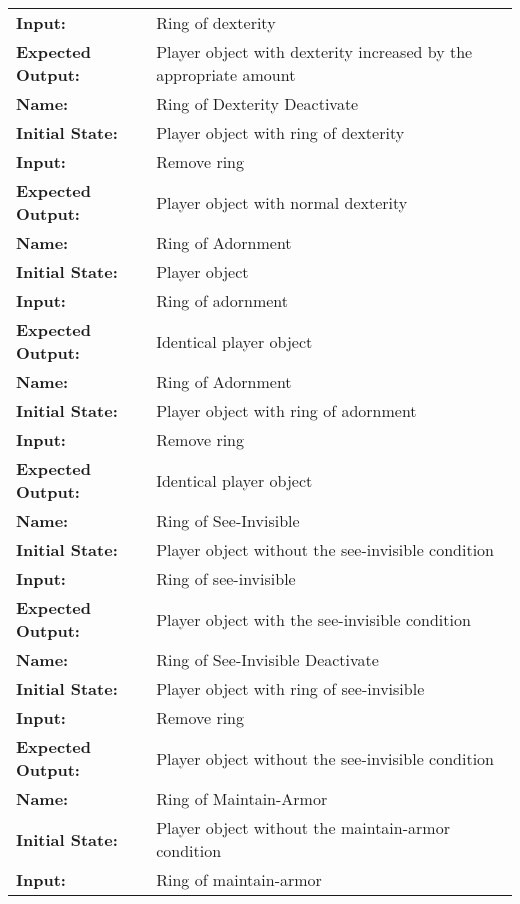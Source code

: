 \documentclass[12pt, titlepage]{article}
\begin{document}
\begin{center}
\begin{longtable}{ l | p{10cm} }
				\textbf{Input:} & Ring of dexterity\\
				\textbf{Expected Output:} & Player object with dexterity increased by the appropriate amount\\[0.6em]
				\hline
				\rule{0pt}{1.5em}\textbf{Name:} & Ring of Dexterity Deactivate\\
				\textbf{Initial State:} & Player object with ring of dexterity\\
				\textbf{Input:} & Remove ring\\
				\textbf{Expected Output:} & Player object with normal dexterity\\[0.6em]
				\hline
				\rule{0pt}{1.5em}\textbf{Name:} & Ring of Adornment\\
				\textbf{Initial State:} & Player object\\
				\textbf{Input:} & Ring of adornment\\
				\textbf{Expected Output:} & Identical player object\\[0.6em]
				\hline
				\rule{0pt}{1.5em}\textbf{Name:} & Ring of Adornment\\
				\textbf{Initial State:} & Player object with ring of adornment\\
				\textbf{Input:} & Remove ring\\
				\textbf{Expected Output:} & Identical player object\\[0.6em]
				\hline
				\rule{0pt}{1.5em}\textbf{Name:} & Ring of See-Invisible\\
				\textbf{Initial State:} & Player object without the see-invisible condition\\
				\textbf{Input:} & Ring of see-invisible\\
				\textbf{Expected Output:} & Player object with the see-invisible condition\\[0.6em]
				\hline
				\rule{0pt}{1.5em}\textbf{Name:} & Ring of See-Invisible Deactivate\\
				\textbf{Initial State:} & Player object with ring of see-invisible\\
				\textbf{Input:} & Remove ring\\
				\textbf{Expected Output:} & Player object without the see-invisible condition\\[0.6em]
				\hline
				\rule{0pt}{1.5em}\textbf{Name:} & Ring of Maintain-Armor\\
				\textbf{Initial State:} & Player object without the maintain-armor condition\\
				\textbf{Input:} & Ring of maintain-armor\\

\end{longtable}
\end{center}
\end{document}
